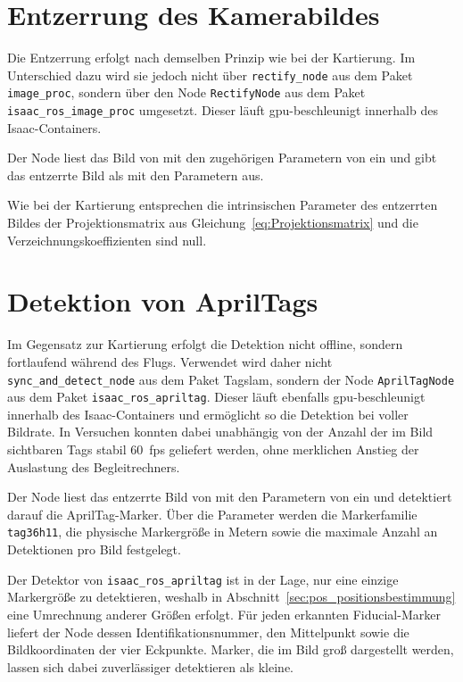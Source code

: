 \section{Entzerrung des Kamerabildes}
\label{sec:pos_entzerrung}
Die Entzerrung erfolgt nach demselben Prinzip wie bei der Kar\-tierung.
Im Unterschied dazu wird sie jedoch nicht über \texttt{rectify\_node} aus dem Paket \texttt{image\_proc}, sondern über den Node \texttt{RectifyNode} aus 
dem Paket \texttt{isaac\_ros\_image\_proc} umgesetzt.
Dieser läuft \gls{gpu}-be\-schleunigt innerhalb des Isaac-Containers.

Der Node liest das Bild von  mit den zugehörigen Parametern von  ein und gibt das 
entzerrte Bild als  mit den Parametern  aus.

Wie bei der Kartierung entsprechen die intrinsischen Parameter des entzerrten Bildes der Projektionsmatrix aus 
Gleichung~\ref{eq:Projektionsmatrix} und die Verzeichnungskoeffizienten sind null.



\section{Detektion von AprilTags}
\label{sec:pos_detektion_apriltags}
Im Gegensatz zur Kartierung erfolgt die Detektion nicht offline, sondern fortlaufend während des Flugs.
Verwendet wird daher nicht \texttt{sync\_and\_detect\_node} aus dem Paket Tag\gls{slam}, sondern der Node \texttt{AprilTagNode} aus dem Paket \texttt{isaac\_ros\_apriltag}.
Dieser läuft ebenfalls \gls{gpu}-beschleunigt innerhalb des Isaac-Containers und ermöglicht so die Detektion bei voller Bildrate.
In Versuchen konnten dabei unabhängig von der Anzahl der im Bild sichtbaren Tags stabil $60$~\gls{fps} geliefert werden, ohne merklichen Anstieg der Auslastung des Begleitrechners.

Der Node liest das entzerrte Bild von  mit den Parametern von  ein und detektiert
darauf die AprilTag-Marker.
Über die Parameter werden die Markerfamilie \texttt{tag36h11}, die physische Markergröße in Metern 
sowie die maximale Anzahl an Detektionen pro Bild festgelegt. 

Der Detektor von \texttt{isaac\_ros\_apriltag} ist in der Lage, nur eine einzige Markergröße zu detektieren, weshalb in Abschnitt~\ref{sec:pos_positionsbestimmung} 
eine Umrechnung anderer Größen erfolgt.
Für jeden erkannten Fiducial-Marker liefert der Node dessen Identifikationsnummer, den Mittelpunkt sowie die Bildkoordinaten der vier Eckpunkte.
Marker, die im Bild groß dargestellt werden, lassen sich dabei zuverlässiger detektieren als kleine.

